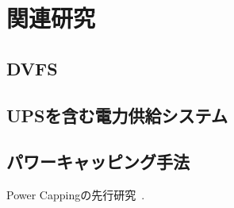 \chapter{関連研究}
\label{chap:background}



\section{DVFS}
\label{sec:dvfs}


\section{UPSを含む電力供給システム}
\label{sec:ups}


\section{パワーキャッピング手法}
\label{sec:capping}

Power Cappingの先行研究~\cite{Fan:2007:PPW:1273440.1250665}.
